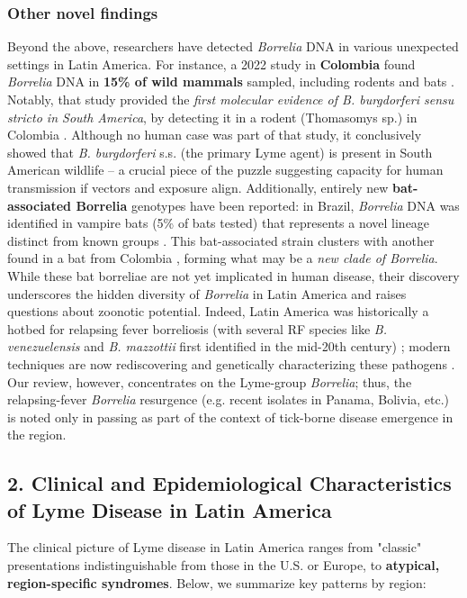 \documentclass[11pt,letterpaper]{article}
\begin{document}
\subsubsection{Other novel findings}
Beyond the above, researchers have detected \textit{Borrelia} DNA in various unexpected settings in Latin America. For instance, a 2022 study in \textbf{Colombia} found \textit{Borrelia} DNA in \textbf{15\% of wild mammals} sampled, including rodents and bats \citep{Mancilla-Agrono2022}. Notably, that study provided the \textit{first molecular evidence of \textit{B. burgdorferi sensu stricto} in South America}, by detecting it in a rodent (Thomasomys sp.) in Colombia \citep{Mancilla-Agrono2022a, Mancilla-Agrono2022b}. Although no human case was part of that study, it conclusively showed that \textit{B. burgdorferi} s.s. (the primary Lyme agent) is present in South American wildlife – a crucial piece of the puzzle suggesting capacity for human transmission if vectors and exposure align. Additionally, entirely new \textbf{bat-associated Borrelia} genotypes have been reported: in Brazil, \textit{Borrelia} DNA was identified in vampire bats (5\% of bats tested) that represents a novel lineage distinct from known groups \citep{Lucca2024h}. This bat-associated strain clusters with another found in a bat from Colombia \citep{Lucca2024i}, forming what may be a \textit{new clade of Borrelia}. While these bat borreliae are not yet implicated in human disease, their discovery underscores the hidden diversity of \textit{Borrelia} in Latin America and raises questions about zoonotic potential. Indeed, Latin America was historically a hotbed for relapsing fever borreliosis (with several RF species like \textit{B. venezuelensis} and \textit{B. mazzottii} first identified in the mid-20th century) \citep{Colunga-Salas2022}; modern techniques are now rediscovering and genetically characterizing these pathogens \citep{Colunga-Salas2022a, Colunga-Salas2022b}. Our review, however, concentrates on the Lyme-group \textit{Borrelia}; thus, the relapsing-fever \textit{Borrelia} resurgence (e.g. recent isolates in Panama, Bolivia, etc.) is noted only in passing as part of the context of tick-borne disease emergence in the region.

\subsection{2. Clinical and Epidemiological Characteristics of Lyme Disease in Latin America}
The clinical picture of Lyme disease in Latin America ranges from "classic" presentations indistinguishable from those in the U.S. or Europe, to \textbf{atypical, region-specific syndromes}. Below, we summarize key patterns by region:
\end{document}
